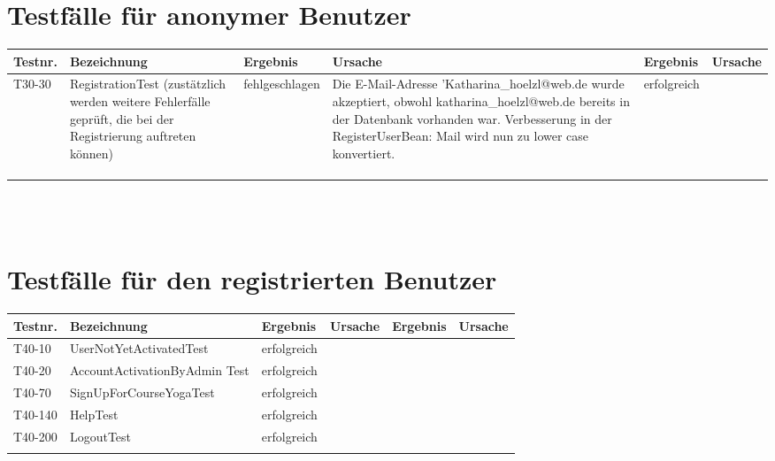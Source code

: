 \begin{landscape}
	\section{Testfälle für anonymer Benutzer}
		\begin{tabular}{|p{2.0cm} |p{5.0cm}|p{3.0cm}|p{5.0cm}|p{4.0cm}|p{4.0cm}|}
			\hline \textbf{Testnr.} & \textbf{Bezeichnung} & \textbf{Ergebnis} & \textbf{Ursache} & \textbf{Ergebnis} & \textbf{Ursache} \\
			\hline   T30-30    & RegistrationTest (zustätzlich werden weitere Fehlerfälle geprüft, die bei der Registrierung auftreten können)   &   fehlgeschlagen       &    Die E-Mail-Adresse 'Katharina\_hoelzl@web.de wurde akzeptiert, obwohl katharina\_hoelzl@web.de bereits in der Datenbank vorhanden war. Verbesserung in der RegisterUserBean: Mail wird nun zu lower case konvertiert.    &    erfolgreich     &       \\
			\hline       &          &          &        &         &       \\
			\hline       &          &          &        &         &       \\
			\hline       &          &          &        &         &       \\
			\hline 
		\end{tabular} \ \\
		\ \\
			
	\section{Testfälle für den registrierten Benutzer}
		\begin{tabular}{|p{2.0cm} |p{5.0cm}|p{3.0cm}|p{5.0cm}|p{4.0cm}|p{4.0cm}|}
			\hline \textbf{Testnr.} & \textbf{Bezeichnung} & \textbf{Ergebnis} & \textbf{Ursache} & \textbf{Ergebnis} & \textbf{Ursache} \\
			\hline T40-10   &  UserNotYetActivatedTest        & erfolgreich   &        &         &       \\
			\hline T40-20   & AccountActivationByAdmin Test  & erfolgreich    &        &         &       \\	
			\hline T40-70   & SignUpForCourseYogaTest & erfolgreich &        &         &       \\	
			\hline T40-140  & HelpTest & erfolgreich &        &         &       \\	
			\hline T40-200  & LogoutTest & erfolgreich &        &         &       \\	
			\hline       &          &          &        &         &       \\
			\hline 
		\end{tabular} \ \\
		\ \\
			

\end{landscape}
